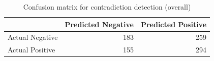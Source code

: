\begin{table}
\caption{Confusion matrix for contradiction detection (overall)}
\label{tab:confusion_matrix}
\begin{tabular}{lrr}
\toprule
 & Predicted Negative & Predicted Positive \\
\midrule
Actual Negative & 183 & 259 \\
Actual Positive & 155 & 294 \\
\bottomrule
\end{tabular}
\end{table}
